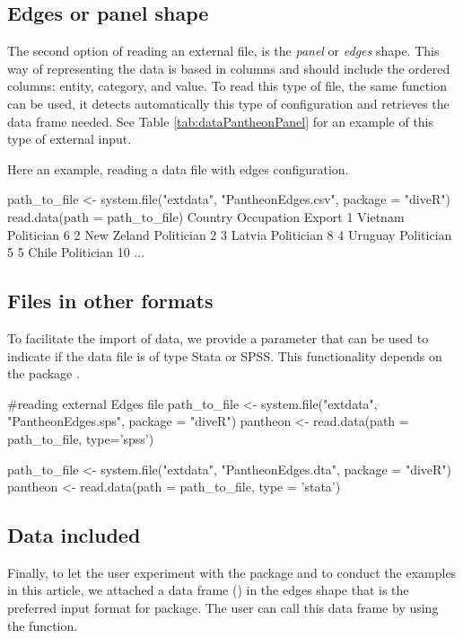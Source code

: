   \subsection{Edges or panel shape}
  The second option of reading an external file, is the \emph{panel} or \emph{edges} shape. This way of representing the data is based in columns and should include the ordered columns: entity, category, and value. To read this type of file, the same function  can be used, it detects automatically this type of configuration and retrieves the data frame needed. See Table \ref{tab:dataPantheonPanel} for an example of this type of external input.



Here an example, reading a data file with edges configuration.

\begin{example}
 path_to_file <- system.file("extdata", "PantheonEdges.csv", package = "diveR")
 read.data(path = path_to_file)
         Country          Occupation Export
1        Vietnam          Politician      6
2     New Zeland          Politician      2
3         Latvia          Politician      8
4        Uruguay          Politician      5
5          Chile          Politician     10
...
\end{example}


\subsection{Files in other formats}
To facilitate the import of data, we provide a parameter  that can be used to indicate if the data file is of type Stata or SPSS. This functionality depends on the package .

\begin{example}
#reading external Edges file
path_to_file <- system.file("extdata", "PantheonEdges.sps", package = "diveR")
pantheon <-  read.data(path = path_to_file, type='spss')
     
path_to_file <- system.file("extdata", "PantheonEdges.dta", package = "diveR")
pantheon <- read.data(path = path_to_file, type = 'stata')
\end{example}
 
\subsection{Data included}

Finally, to let the user experiment with the package and to conduct the examples in this article, we attached a data frame () in the edges shape that is the preferred input format for  package. The user can call this data frame by using the  function. 

